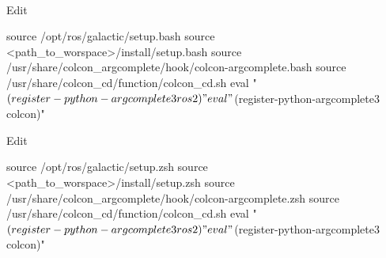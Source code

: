 \documentclass[usenames,11,dvipsnames,svgnames,x11names,aspectratio=1610,bibref]{beamer}
\newcommand{\mydisclaimer}{{\color{disclaimer}{\scriptsize ROS 2 -- Part I}}}
\renewcommand\sec{{\cnordSix{\secname}\hfill\mydisclaimer~} }
\begin{document}
\begin{frame}[fragile]{\sec}
\vspace*{\fill}
\begin{center} 


\begin{compactitem}
\footnotesize
\item Edit 
    \begin{bashScriptListLine}
source /opt/ros/galactic/setup.bash
source <path_to_worspace>/install/setup.bash 
source /usr/share/colcon_argcomplete/hook/colcon-argcomplete.bash
source /usr/share/colcon_cd/function/colcon_cd.sh
eval "$(register-python-argcomplete3 ros2)"
eval "$(register-python-argcomplete3 colcon)"
    \end{bashScriptListLine}

\item Edit 
    \begin{bashScriptListLine}
source /opt/ros/galactic/setup.zsh
source <path_to_worspace>/install/setup.zsh 
source /usr/share/colcon_argcomplete/hook/colcon-argcomplete.zsh
source /usr/share/colcon_cd/function/colcon_cd.sh
eval "$(register-python-argcomplete3 ros2)"
eval "$(register-python-argcomplete3 colcon)"
    \end{bashScriptListLine}
    
\end{compactitem}

\end{center}
\vspace*{\fill}
\end{frame}


\end{document}
